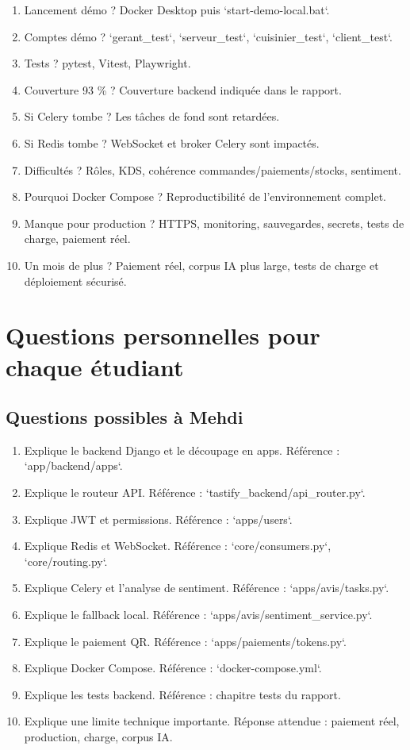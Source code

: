 \documentclass[11pt,a4paper]{article}
\begin{document}
\begin{enumerate}
\item Lancement démo ? Docker Desktop puis `start-demo-local.bat`.
\item Comptes démo ? `gerant\_test`, `serveur\_test`, `cuisinier\_test`, `client\_test`.
\item Tests ? pytest, Vitest, Playwright.
\item Couverture 93 \% ? Couverture backend indiquée dans le rapport.
\item Si Celery tombe ? Les tâches de fond sont retardées.
\item Si Redis tombe ? WebSocket et broker Celery sont impactés.
\item Difficultés ? Rôles, KDS, cohérence commandes/paiements/stocks, sentiment.
\item Pourquoi Docker Compose ? Reproductibilité de l'environnement complet.
\item Manque pour production ? HTTPS, monitoring, sauvegardes, secrets, tests de charge, paiement réel.
\item Un mois de plus ? Paiement réel, corpus IA plus large, tests de charge et déploiement sécurisé.
\end{enumerate}

\section{Questions personnelles pour chaque étudiant}

\subsection*{Questions possibles à Mehdi}
\begin{enumerate}
\item Explique le backend Django et le découpage en apps. Référence : `app/backend/apps`.
\item Explique le routeur API. Référence : `tastify\_backend/api\_router.py`.
\item Explique JWT et permissions. Référence : `apps/users`.
\item Explique Redis et WebSocket. Référence : `core/consumers.py`, `core/routing.py`.
\item Explique Celery et l'analyse de sentiment. Référence : `apps/avis/tasks.py`.
\item Explique le fallback local. Référence : `apps/avis/sentiment\_service.py`.
\item Explique le paiement QR. Référence : `apps/paiements/tokens.py`.
\item Explique Docker Compose. Référence : `docker-compose.yml`.
\item Explique les tests backend. Référence : chapitre tests du rapport.
\item Explique une limite technique importante. Réponse attendue : paiement réel, production, charge, corpus IA.
\end{enumerate}
\end{document}

